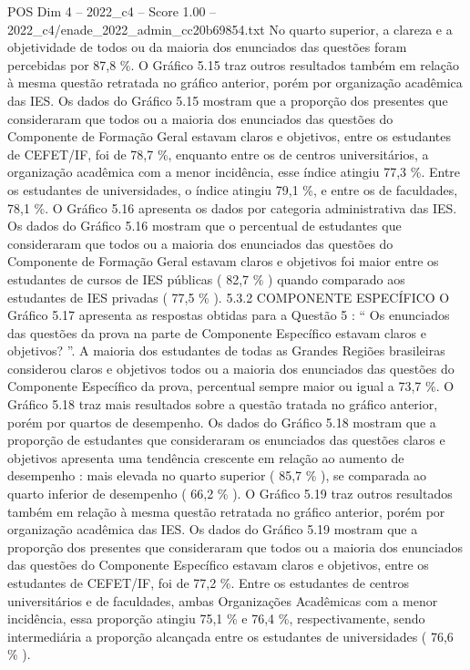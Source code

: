 \begin{textsample}{POS Dim 4 – 2022\_c4 – Score 1.00 – 2022\_c4/enade\_2022\_admin\_cc20b69854.txt}
No quarto superior, a clareza e a objetividade de todos ou da maioria dos enunciados das questões foram percebidas por 87,8 \%.
O Gráfico 5.15 traz outros resultados também em relação à mesma questão retratada no gráfico anterior, porém por organização acadêmica das IES.
Os dados do Gráfico 5.15 mostram que a proporção dos presentes que consideraram que todos ou a maioria dos enunciados das questões do Componente de Formação Geral estavam claros e objetivos, entre os estudantes de CEFET/IF, foi de 78,7 \%, enquanto entre os de centros universitários, a organização acadêmica com a menor incidência, esse índice atingiu 77,3 \%.
Entre os estudantes de universidades, o índice atingiu 79,1 \%, e entre os de faculdades, 78,1 \%.
O Gráfico 5.16 apresenta os dados por categoria administrativa das IES.
Os dados do Gráfico 5.16 mostram que o percentual de estudantes que consideraram que todos ou a maioria dos enunciados das questões do Componente de Formação Geral estavam claros e objetivos foi maior entre os estudantes de cursos de IES públicas ( 82,7 \% ) quando comparado aos estudantes de IES privadas ( 77,5 \% ). 5.3.2 COMPONENTE ESPECÍFICO O Gráfico 5.17 apresenta as respostas obtidas para a Questão 5 : “ Os enunciados das questões da prova na parte de Componente Específico estavam claros e objetivos? ”.
A maioria dos estudantes de todas as Grandes Regiões brasileiras considerou claros e objetivos todos ou a maioria dos enunciados das questões do Componente Específico da prova, percentual sempre maior ou igual a 73,7 \%.
O Gráfico 5.18 traz mais resultados sobre a questão tratada no gráfico anterior, porém por quartos de desempenho.
Os dados do Gráfico 5.18 mostram que a proporção de estudantes que consideraram os enunciados das questões claros e objetivos apresenta uma tendência crescente em relação ao aumento de desempenho : mais elevada no quarto superior ( 85,7 \% ), se comparada ao quarto inferior de desempenho ( 66,2 \% ).
O Gráfico 5.19 traz outros resultados também em relação à mesma questão retratada no gráfico anterior, porém por organização acadêmica das IES.
Os dados do Gráfico 5.19 mostram que a proporção dos presentes que consideraram que todos ou a maioria dos enunciados das questões do Componente Específico estavam claros e objetivos, entre os estudantes de CEFET/IF, foi de 77,2 \%.
Entre os estudantes de centros universitários e de faculdades, ambas Organizações Acadêmicas com a menor incidência, essa proporção atingiu 75,1 \% e 76,4 \%, respectivamente, sendo intermediária a proporção alcançada entre os estudantes de universidades ( 76,6 \% ).

\end{textsample}
